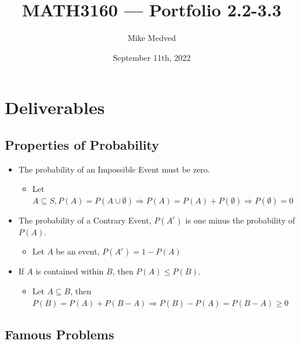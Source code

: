 \documentclass{article}
\title{MATH3160 — Portfolio 2.2-3.3}
\author{Mike Medved}
\date{September 11th, 2022}
\begin{document}
\maketitle

\section{Deliverables}

\subsection{Properties of Probability}

\begin{itemize}
    \item The probability of an Impossible Event must be zero.
    \begin{itemize}
        \item Let $A \subseteq S, P(A) = P(A \cup \emptyset) \Rightarrow P(A) = P(A) + P(\emptyset) \Rightarrow P(\emptyset) = 0$
    \end{itemize}
    \item The probability of a Contrary Event, $P(A^c)$ is one minus the probability of $P(A)$.
    \begin{itemize}
        \item Let $A$ be an event, $P(A^c) = 1 - P(A)$
    \end{itemize}
    \item If $A$ is contained within $B$, then $P(A) \leq P(B)$.
    \begin{itemize}
        \item Let $A \subseteq B$, then $P(B) = P(A) + P(B - A) \Rightarrow P(B) - P(A) = P(B - A) \geq 0$
    \end{itemize}
\end{itemize}

\subsection{Famous Problems}
\end{document}
